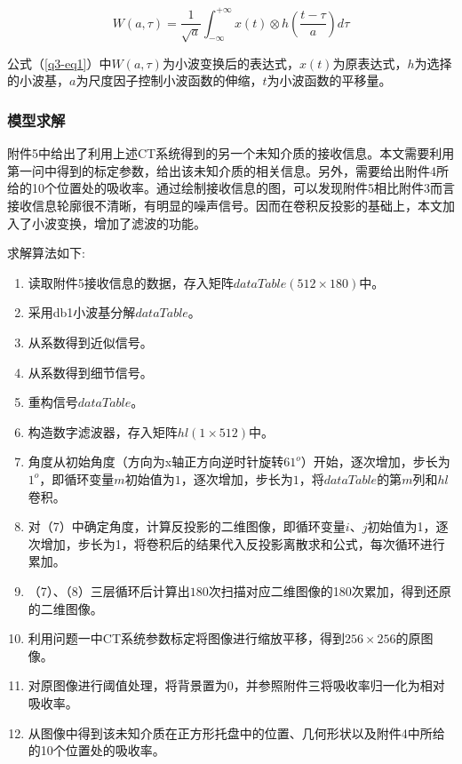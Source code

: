 \documentclass[withoutpreface,bwprint]{cumcmthesis} %
\begin{document}
\begin{equation}
	\label{q3-eq1}
	W(a,\tau) = \frac{1}{\sqrt{a}}\int_{-\infty}^{+\infty} x(t) \otimes h(\frac{t - \tau}{a}) d \tau
\end{equation}

\par 公式（\ref{q3-eq1}）中$W(a,\tau)$为小波变换后的表达式，$x(t)$为原表达式，$h$为选择的小波基，$a$为尺度因子控制小波函数的伸缩，$t$为小波函数的平移量。

\subsubsection{模型求解}
\par 附件5中给出了利用上述CT系统得到的另一个未知介质的接收信息。本文需要利用第一问中得到的标定参数，给出该未知介质的相关信息。另外，需要给出附件4所给的10个位置处的吸收率。通过绘制接收信息的图，可以发现附件5相比附件3而言接收信息轮廓很不清晰，有明显的噪声信号。因而在卷积反投影的基础上，本文加入了小波变换，增加了滤波的功能。
\par 求解算法如下:

\begin{enumerate}
	\item 读取附件5接收信息的数据，存入矩阵$dataTable(512\times180)$中。
	\item 采用db1小波基分解$dataTable$。
	\item 从系数得到近似信号。
	\item 从系数得到细节信号。
	\item 重构信号$dataTable$。
	\item 构造数字滤波器，存入矩阵$hl(1\times 512)$中。
	\item 角度从初始角度（方向为x轴正方向逆时针旋转$61^o$）开始，逐次增加，步长为$1^o$，即循环变量$m$初始值为$1$，逐次增加，步长为$1$，将$dataTable$的第$m$列和$hl$卷积。
	\item 对（7）中确定角度，计算反投影的二维图像，即循环变量$i$、$j$初始值为1，逐次增加，步长为1，将卷积后的结果代入反投影离散求和公式，每次循环进行累加。
	\item （7）、（8）三层循环后计算出$180$次扫描对应二维图像的180次累加，得到还原的二维图像。
	\item 利用问题一中CT系统参数标定将图像进行缩放平移，得到$256\times 256$的原图像。
	\item 对原图像进行阈值处理，将背景置为0，并参照附件三将吸收率归一化为相对吸收率。
	\item 从图像中得到该未知介质在正方形托盘中的位置、几何形状以及附件4中所给的10个位置处的吸收率。
\end{enumerate}
\end{document}
